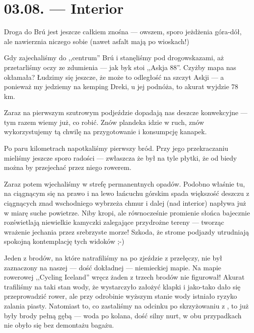 \chapter*{03.08. --- Interior}

Droga do Brú jest jeszcze całkiem znośna --- owszem, sporo jeżdżenia góra-dół, ale nawierznia niczego sobie (nawet asfalt mają po wioskach!)

Gdy zajechaliśmy do ,,centrum'' Brú i stanęliśmy pod drogowskazami, aż przetarliśmy oczy ze zdumienia --- jak byk stoi ,,Askja 88''. Czyżby mapa nas okłamała? Łudzimy się jeszcze, że może to odległość na szczyt Askji --- a ponieważ my jedziemy na kemping Dreki, u jej podnóża, to akurat wyjdzie 78 km.

Zaraz na pierwszym szutrowym podjeździe dopadają nas deszcze konwekcyjne --- tym razem wiemy już, co robić. Znów plandeka idzie w ruch, znów wykorzystujemy tą chwilę na przygotowanie i konsumpcję kanapek.

Po paru kilometrach napotkaliśmy pierwszy bród. Przy jego przekraczaniu mieliśmy jeszcze sporo radości --- zwłaszcza że był na tyle płytki, że od biedy można by przejechać przez niego rowerem.

Zaraz potem wjechaliśmy w strefę permanentnych opadów. Podobno właśnie tu, na ciągnącym się na prawo i na lewo łańcuchu górskim spada większość deszczu z ciągnących znad wschodniego wybrzeża chmur i dalej (nad interior) napływa już w miarę suche powietrze. Niby kropi, ale równocześnie promienie słońca bajecznie rozświetlają niewielkie kamyczki zalegające przydrożne tereny --- tworząc wrażenie jechania przez srebrzyste morze! Szkoda, że strome podjazdy utrudniają spokojną kontemplację tych widoków ;-)


Jeden z brodów, na które natrafiliśmy na  po zjeździe z przełęczy, nie był zaznaczony na naszej --- dość dokładnej --- niemieckiej mapie. Na mapie rowerowej ,,Cycling Iceland'' wręcz żaden z trzech brodów nie figurował! Akurat trafiliśmy na taki stan wody, że wystarczyło założyć klapki i jako-tako dało się przeprowadzić rower, ale przy odrobinie wyższym stanie wody istniało ryzyko zalania piasty. Natomiast to, co zastaliśmy na odcinku po skrzyżowaniu z , to już były brody pełną gębą --- woda po kolana, dość silny nurt, w obu przypadkach nie obyło się bez demontażu bagażu.


